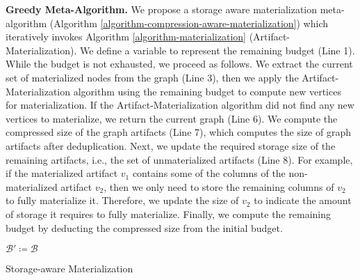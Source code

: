 \textbf{Greedy Meta-Algorithm.}
We propose a storage aware materialization meta-algorithm (Algorithm \ref{algorithm-compression-aware-materialization}) which iteratively invokes Algorithm \ref{algorithm-materialization} (Artifact-Materialization).
We define a variable to represent the remaining budget (Line 1).
While the budget is not exhausted, we proceed as follows.
We extract the current set of materialized nodes from the graph (Line 3), then we apply the Artifact-Materialization algorithm using the remaining budget to compute new vertices for materialization.
If the Artifact-Materialization algorithm did not find any new vertices to materialize, we return the current graph (Line 6).
We compute the compressed size of the graph artifacts (Line 7), which computes the size of graph artifacts after deduplication. 
Next, we update the required storage size of the remaining artifacts, i.e., the set of unmaterialized artifacts (Line 8).
For example, if the materialized artifact $v_1$ contains some of the columns of the non-materialized artifact $v_2$, then we only need to store the remaining columns of $v_2$ to fully materialize it.
Therefore, we update the size of $v_2$ to indicate the amount of storage it requires to fully materialize.
Finally, we compute the remaining budget by deducting the compressed size from the initial budget.
\begin{algorithm}[h]
$ \mathcal{B}' \coloneqq  \mathcal{B}$ \;
\caption{Storage-aware Materialization}\label{algorithm-compression-aware-materialization}
\end{algorithm}

